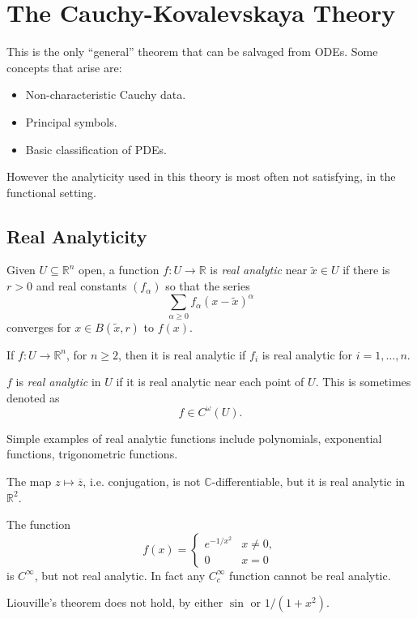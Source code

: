\documentclass[12pt]{article}
\begin{document}
\newpage

\section{The Cauchy-Kovalevskaya Theory}%
\label{sec:ck}

This is the only ``general'' theorem that can be salvaged from ODEs. Some concepts that arise are:
\begin{itemize}
	\item Non-characteristic Cauchy data.
	\item Principal symbols.
	\item Basic classification of PDEs.
\end{itemize}
However the analyticity used in this theory is most often not satisfying, in the functional setting.

\subsection{Real Analyticity}%
\label{sub:ra}

\begin{definition}
	Given $U \subseteq \mathbb{R}^n$ open, a function $f : U \to \mathbb{R}$ is \emph{real analytic} near $\tilde x \in U$ if there is $r > 0$ and real constants $(f_\alpha)$ so that the series
	\[
	\sum_{\alpha \geq 0} f_\alpha(x - \tilde x)^\alpha
	\]
	converges for $x \in B(\tilde x, r)$ to $f(x)$.

	If $f : U \to \mathbb{R}^n$, for $n \geq 2$, then it is real analytic if $f_i$ is real analytic for $i = 1, \ldots, n$.

	$f$ is \emph{real analytic} in $U$ if it is real analytic near each point of $U$. This is sometimes denoted as
	\[
	f \in C^\omega (U).
	\]
\end{definition}

\begin{exbox}
	Simple examples of real analytic functions include polynomials, exponential functions, trigonometric functions.

	The map $z \mapsto \overline{z}$, i.e. conjugation, is not $\mathbb{C}$-differentiable, but it is real analytic in $\mathbb{R}^2$.

	The function
	\[
	f(x) =
	\begin{cases}
		e^{-1/x^2} & x \neq 0, \\
		0 & x = 0
	\end{cases}
	\]
	is $C^\infty$, but not real analytic. In fact any $C_c^\infty$ function cannot be real analytic.

	Liouville's theorem does not hold, by either $\sin$ or $1/(1 + x^2)$.
\end{exbox}
\end{document}
